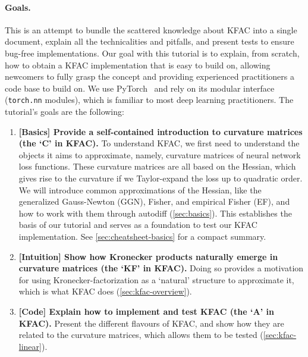 \paragraph{Goals.}
This is an attempt to bundle the scattered knowledge about KFAC into a single document, explain all the technicalities and pitfalls, and present tests to ensure bug-free implementations.
Our goal with this tutorial is to explain, from scratch, how to obtain a KFAC implementation that is easy to build on, allowing newcomers to fully grasp the concept and providing experienced practitioners a code base to build on.
We use PyTorch~\cite{paszke2019pytorch} and rely on its modular interface (\texttt{torch.nn} modules), which is familiar to most deep learning practitioners.
The tutorial's goals are the following:
\begin{enumerate}
\item \textbf{[Basics] Provide a self-contained introduction to curvature matrices (the `C' in KFAC).}
  To understand KFAC, we first need to understand the objects it aims to approximate, namely, curvature matrices of neural network loss functions.
  These curvature matrices are all based on the Hessian, which gives rise to the curvature if we Taylor-expand the loss up to quadratic order.
  We will introduce common approximations of the Hessian, like the generalized Gauss-Newton (GGN), Fisher, and empirical Fisher (EF), and how to work with them through autodiff (\cref{sec:basics}).
  This establishes the basis of our tutorial and serves as a foundation to test our KFAC implementation.
  See \cref{sec:cheatsheet-basics} for a compact summary.

\item \textbf{[Intuition] Show how Kronecker products naturally emerge in curvature matrices (the `KF' in KFAC).}
  Doing so provides a motivation for using Kronecker-factorization as a `natural' structure to approximate it, which is what KFAC does (\cref{sec:kfac-overview}).

\item \textbf{[Code] Explain how to implement and test KFAC (the `A' in KFAC).}
  Present the different flavours of KFAC, and show how they are related to the curvature matrices, which allows them to be tested (\cref{sec:kfac-linear}).
\end{enumerate}
